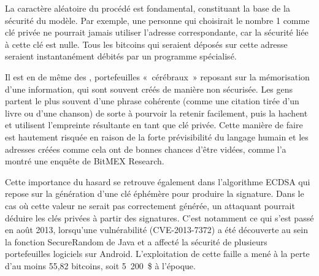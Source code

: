 La caractère aléatoire du procédé est fondamental, constituant la base de la sécurité du modèle. Par exemple, une personne qui choisirait le nombre 1 comme clé privée ne pourrait jamais utiliser l'adresse correspondante, car la sécurité liée à cette clé est nulle. Tous les bitcoins qui seraient déposés sur cette adresse seraient instantanément débités par un programme spécialisé.

Il est en de même des , portefeuilles «~cérébraux~» reposant sur la mémorisation d'une information, qui sont souvent créés de manière non sécurisée. Les gens partent le plus souvent d'une phrase cohérente (comme une citation tirée d'un livre ou d'une chanson) de sorte à pourvoir la retenir facilement, puis la hachent et utilisent l'empreinte résultante en tant que clé privée. Cette manière de faire est hautement risquée en raison de la forte prévisibilité du langage humain et les adresses créées comme cela ont de bonnes chances d'être vidées, comme l'a montré une enquête de BitMEX Research.

Cette importance du hasard se retrouve également dans l'algorithme ECDSA qui repose sur la génération d'une clé éphémère pour produire la signature. Dans le cas où cette valeur ne serait pas correctement générée, un attaquant pourrait déduire les clés privées à partir des signatures. C'est notamment ce qui s'est passé en août 2013, lorsqu'une vulnérabilité (CVE-2013-7372) a été découverte au sein la fonction SecureRandom de Java et a affecté la sécurité de plusieurs portefeuilles logiciels sur Android. L'exploitation de cette faille a mené à la perte d'au moins 55,82 bitcoins, soit 5~200~\$ à l'époque. %


